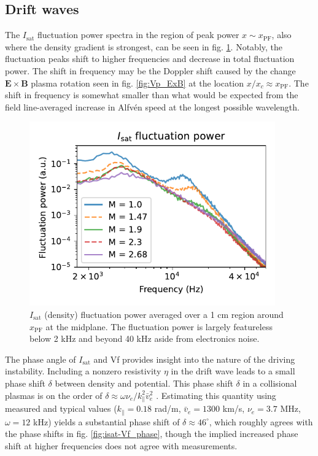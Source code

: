 \subsection{Drift waves}
The $I_\text{sat}$ fluctuation power spectra in the region of peak power $x \sim x_\text{PF}$, also where the density gradient is strongest, can be seen in fig. \ref{fig:isat_fluct_power}. Notably, the fluctuation peaks shift to higher frequencies and decrease in total fluctuation power. The shift in frequency may be the Doppler shift caused by the change $\boldsymbol{E \times B}$ plasma rotation seen in fig. \ref{fig:Vp_ExB} at the location $x/x_c \approx x_\text{PF}$. The shift in frequency is somewhat smaller than what would be expected from the field line-averaged increase in Alfv\'en speed at the longest possible wavelength.
\begin{figure}
    \centering
    \includegraphics[width=300pt]{figures/fig10.pdf}
    \caption{$I_\text{sat}$ (density) fluctuation power averaged over a 1 cm region around $x_\text{PF}$ at the midplane. The fluctuation power is largely featureless below 2 kHz and beyond 40 kHz aside from electronics noise.}
    \label{fig:isat_fluct_power}
\end{figure}
The phase angle of $I_\text{sat}$ and Vf provides insight into the nature of the driving instability. Including a nonzero resistivity $\eta$ in the drift wave leads to a small phase shift $\delta$ between density and potential.
This phase shift $\delta$ in a collisional plasmas is on the order of $\delta \approx \omega \nu_e / k_\parallel^2 \bar{v}_e^2$ \cite{Horton_1999}. Estimating this quantity using measured and typical values ($k_\parallel = 0.18$ rad/m, $\bar{v}_e = 1300$ km/s, $\nu_e = 3.7$ MHz, $\omega = 12$ kHz) yields a substantial phase shift of $\delta \approx 46^\circ$, which roughly agrees with the phase shifts in fig. \ref{fig:isat-Vf_phase}, though the implied increased phase shift at higher frequencies does not agree with measurements.
